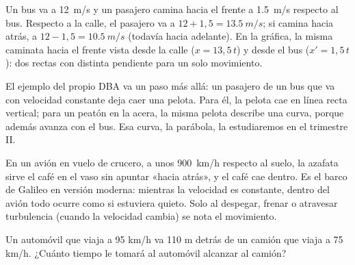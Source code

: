 \documentclass[11pt]{article}
\begin{document}
\begin{ejemplo}
Un bus va a \qty{12}{m/s} y un pasajero camina hacia el frente a \qty{1,5}{m/s} respecto al
bus. Respecto a la calle, el pasajero va a $12 + 1{,}5 = \qty{13,5}{m/s}$; si camina hacia
atrás, a $12 - 1{,}5 = \qty{10,5}{m/s}$ (todavía hacia adelante). En la gráfica, la misma
caminata hacia el frente vista desde la calle ($x = 13{,}5\,t$) y desde el bus ($x' = 1{,}5\,t$):
dos rectas con distinta pendiente para un solo movimiento.

\begin{center}
\end{center}
\end{ejemplo}

El ejemplo del propio DBA va un paso más allá: un pasajero de un bus que va con velocidad
constante deja caer una pelota. Para él, la pelota cae en línea recta vertical; para un peatón
en la acera, la misma pelota describe una curva, porque además avanza con el bus. Esa curva,
la parábola, la estudiaremos en el trimestre II.

\begin{aplicacion}
En un avión en vuelo de crucero, a unos \qty{900}{km/h} respecto al suelo, la azafata sirve
el café en el vaso sin apuntar «hacia atrás», y el café cae dentro. Es el barco de Galileo en
versión moderna: mientras la velocidad es constante, dentro del avión todo ocurre como si
estuviera quieto. Solo al despegar, frenar o atravesar turbulencia (cuando la velocidad
cambia) se nota el movimiento.
\end{aplicacion}

\begin{preguntas}
\pregunta Un automóvil que viaja a 95 km/h va 110 m detrás de un camión que viaja a 75 km/h.
¿Cuánto tiempo le tomará al automóvil alcanzar al camión?
\espacio{3cm}
\end{preguntas}
\end{document}
